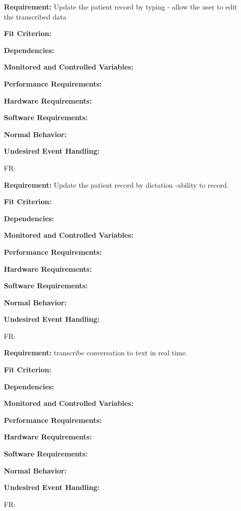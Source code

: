 \documentclass[12pt]{article}
\newcounter{reqnum} %
\begin{document}
\begin{itemize}
\textbf{Requirement:} Update the patient record by typing - allow the user to edit the transcribed data

\textbf{Fit Criterion:}  

\textbf{Dependencies:}  

\textbf{Monitored and Controlled Variables:} 

\textbf{Performance Requirements:} 

\textbf{Hardware Requirements:} 

\textbf{Software Requirements:} 

\textbf{Normal Behavior:} 

\textbf{Undesired Event Handling:} 

\item[FR\refstepcounter{reqnum}\thereqnum \label{FR_meaningfulLabel}:] 

\textbf{Requirement:} Update the patient record by dictation -ability to record. 

\textbf{Fit Criterion:}  

\textbf{Dependencies:}  

\textbf{Monitored and Controlled Variables:} 

\textbf{Performance Requirements:} 

\textbf{Hardware Requirements:} 

\textbf{Software Requirements:} 

\textbf{Normal Behavior:} 

\textbf{Undesired Event Handling:} 

\item[FR\refstepcounter{reqnum}\thereqnum \label{FR_meaningfulLabel}:] 

\textbf{Requirement:} transcribe conversation to text in real time. 

\textbf{Fit Criterion:}  

\textbf{Dependencies:}  

\textbf{Monitored and Controlled Variables:} 

\textbf{Performance Requirements:} 

\textbf{Hardware Requirements:} 

\textbf{Software Requirements:} 

\textbf{Normal Behavior:} 

\textbf{Undesired Event Handling:} 

\item[FR\refstepcounter{reqnum}\thereqnum \label{FR_meaningfulLabel}:] 


\end{itemize}
\end{document}
